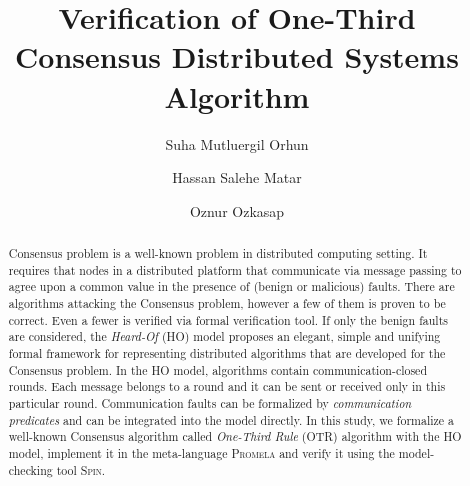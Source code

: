 \documentclass{llncs}
\begin{document}
%
\frontmatter          %
%
\pagestyle{headings}  %
%
%
\mainmatter              %
%
\title{Verification of One-Third Consensus Distributed Systems Algorithm}
%
%
\author{Suha Mutluergil Orhun \and Hassan Salehe Matar \and
 Oznur Ozkasap}
%
%
%

\maketitle              %

\begin{abstract}
Consensus problem is a well-known problem in distributed computing setting. It requires that nodes in a distributed platform that communicate via message passing to agree upon a common value in the presence of (benign or malicious) faults. There are algorithms attacking the Consensus problem, however a few of them is proven to be correct. Even a fewer is verified via formal verification tool. If only the benign faults are considered, the \emph{Heard-Of} (HO) model proposes an elegant, simple and unifying formal framework for representing distributed algorithms that are developed for the Consensus problem. In the HO model, algorithms contain communication-closed rounds. Each message belongs to a round and it can be sent or received only in this particular round. Communication faults can be formalized by \emph{communication predicates} and can be integrated into the model directly. In this study, we formalize a well-known Consensus algorithm called \emph{One-Third Rule} (OTR) algorithm with the HO model, implement it in the meta-language \textsc{Promela} and verify it using the model-checking tool \textsc{Spin}.
\end{abstract}
\end{document}
